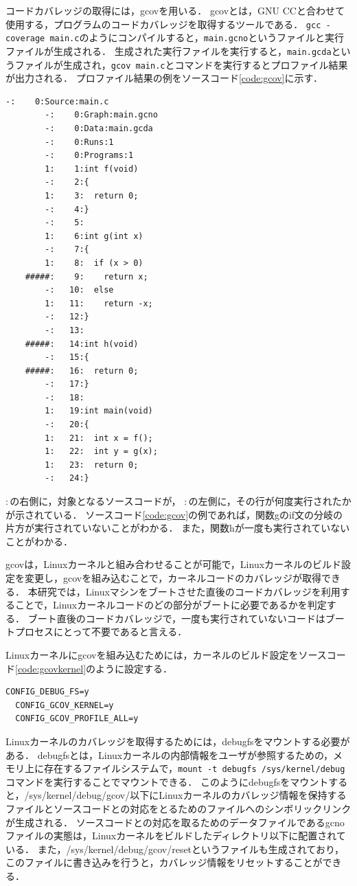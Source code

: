 \documentclass[graduation-thesis]{mlarticle}
\begin{document}
コードカバレッジの取得には，gcovを用いる．
gcovとは，GNU CCと合わせて使用する，プログラムのコードカバレッジを取得するツールである．
\texttt{gcc -coverage main.c}のようにコンパイルすると，\texttt{main.gcno}というファイルと実行ファイルが生成される．
生成された実行ファイルを実行すると，\texttt{main.gcda}というファイルが生成され，\texttt{gcov main.c}とコマンドを実行するとプロファイル結果が出力される．
プロファイル結果の例をソースコード\ref{code:gcov}に示す．

\begin{lstlisting}[caption=gcovの実行結果例, label=code:gcov]
        -:    0:Source:main.c
        -:    0:Graph:main.gcno
        -:    0:Data:main.gcda
        -:    0:Runs:1
        -:    0:Programs:1
        1:    1:int f(void)
        -:    2:{
        1:    3:  return 0;
        -:    4:}
        -:    5:
        1:    6:int g(int x)
        -:    7:{
        1:    8:  if (x > 0)
    #####:    9:    return x;
        -:   10:  else
        1:   11:    return -x;
        -:   12:}
        -:   13:
    #####:   14:int h(void)
        -:   15:{
    #####:   16:  return 0;
        -:   17:}
        -:   18:
        1:   19:int main(void)
        -:   20:{
        1:   21:  int x = f();
        1:   22:  int y = g(x);
        1:   23:  return 0;
        -:   24:}
\end{lstlisting}

$:$の右側に，対象となるソースコードが，
$:$の左側に，その行が何度実行されたかが示されている．
ソースコード\ref{code:gcov}の例であれば，関数gのif文の分岐の片方が実行されていないことがわかる．
また，関数hが一度も実行されていないことがわかる．

gcovは，Linuxカーネルと組み合わせることが可能で，Linuxカーネルのビルド設定を変更し，gcovを組み込むことで，カーネルコードのカバレッジが取得できる．
本研究では，Linuxマシンをブートさせた直後のコードカバレッジを利用することで，Linuxカーネルコードのどの部分がブートに必要であるかを判定する．
ブート直後のコードカバレッジで，一度も実行されていないコードはブートプロセスにとって不要であると言える．

Linuxカーネルにgcovを組み込むためには，カーネルのビルド設定をソースコード\ref{code:gcovkernel}のように設定する．

\begin{lstlisting}[caption=gcovを組み込むLinuxカーネルの設定, label=code:gcovkernel]
  CONFIG_DEBUG_FS=y
  CONFIG_GCOV_KERNEL=y
  CONFIG_GCOV_PROFILE_ALL=y
\end{lstlisting}

Linuxカーネルのカバレッジを取得するためには，debugfsをマウントする必要がある．
debugfsとは，Linuxカーネルの内部情報をユーザが参照するための，メモリ上に存在するファイルシステムで，\texttt{mount -t debugfs /sys/kernel/debug}コマンドを実行することでマウントできる．
このようにdebugfsをマウントすると，/sys/kernel/debug/gcov/以下にLinuxカーネルのカバレッジ情報を保持するファイルとソースコードとの対応をとるためのファイルへのシンボリックリンクが生成される．
ソースコードとの対応を取るためのデータファイルであるgcnoファイルの実態は，Linuxカーネルをビルドしたディレクトリ以下に配置されている．
また，/sys/kernel/debug/gcov/resetというファイルも生成されており，このファイルに書き込みを行うと，カバレッジ情報をリセットすることができる．
\end{document}

